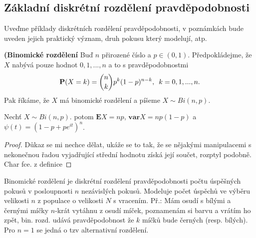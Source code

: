 \subsection{Základní diskrétní rozdělení pravděpodobnosti}
Uveďme příklady diskrétních rozdělení pravděpodobnosti, v poznámkách bude uveden jejich praktický význam, druh pokusu který modelují, atp.
\begin{definition}{\textbf{(Binomické rozdělení}}
Buď $n$ přirozené číslo a $p \in (0, 1)$. Předpokládejme, že $X$ nabývá pouze hodnot $0, 1, ..., n$ a to s pravděpodobnostmi
\begin{equation}
\textbf{P}(X = k) = \binom{n}{k}p^{k}(1-p)^{n-k}, \enskip k = 0, 1, ..., n.
\end{equation}
Pak říkáme, že $X$ má binomické rozdělení a píšeme $X \sim Bi(n,p)$.
\end{definition}
\begin{proposition}
Nechť  $X \sim Bi(n,p)$. potom $\mathbf{E}X = np$, $\mathbf{var}X = np(1-p)$ a $\psi(t) = (1-p + pe^{it})^{n}$.
\end{proposition}
\begin{proof}
Důkaz se mi nechce dělat, ukáže se to tak, že se nějakými manipulacemi s nekonečnou řadou vyjadřující střední hodnotu získá její součet, rozptyl podobně. Char fce. z definice
\end{proof}

\begin{remark}
Binomické rozdělení je diskrétní rozdělení pravděpodobnosti počtu úspěšných pokusů v posloupnosti $n$ nezávislých pokusů.
Modeluje počet úspěchů ve výběru velikosti $n$ z populace o velikosti $N$ s vracením. Př.: Mám osudí s bílými a černými míčky $n$-krát vytáhnu z osudí míček, poznamenám si barvu a vrátím ho zpět, bin. rozd. udává pravděpodobnost že $k$ míčků bude černých (resp. bílých). Pro $n = 1$ se jedná o tzv alternativní rozdělení.
\end{remark}

